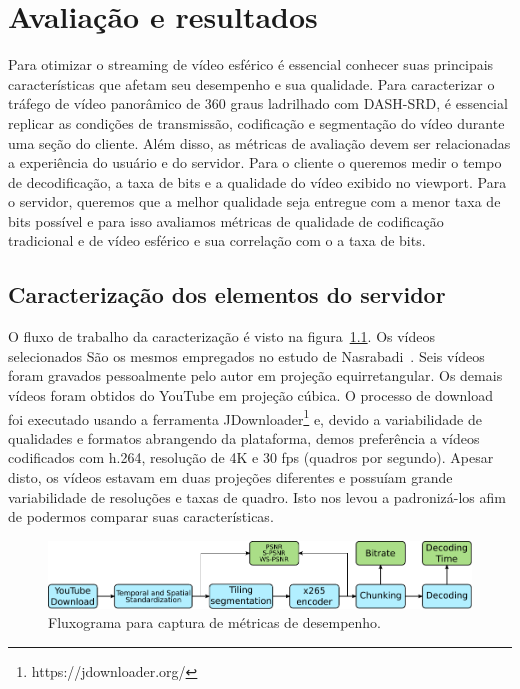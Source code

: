 \chapter{Avaliação e resultados}\label{Cap:Evaluation}

Para otimizar o streaming de vídeo esférico é essencial conhecer suas principais características que afetam seu desempenho e sua qualidade. Para caracterizar o tráfego de vídeo panorâmico de 360 graus ladrilhado com DASH-SRD, é essencial replicar as condições de transmissão, codificação e segmentação do vídeo durante uma seção do cliente. Além disso, as métricas de avaliação devem ser relacionadas a experiência do usuário e do servidor. Para o cliente o queremos medir o tempo de decodificação, a taxa de bits e a qualidade do vídeo exibido no viewport. Para o servidor, queremos que a melhor qualidade seja entregue com a menor taxa de bits possível e para isso avaliamos métricas de qualidade de codificação tradicional e de vídeo esférico e sua correlação com o a taxa de bits.




\section{Caracterização dos elementos do servidor}

O fluxo de trabalho da caracterização é visto na figura~\ref{fig:fluxograma1}. Os vídeos selecionados São os mesmos empregados no estudo de Nasrabadi~\cite{Nasrabadi2019}. Seis vídeos foram gravados pessoalmente pelo autor em projeção equirretangular. Os demais vídeos foram obtidos do YouTube em projeção cúbica. O processo de download foi executado usando a ferramenta JDownloader\footnote{https://jdownloader.org/} e, devido a variabilidade de qualidades e formatos abrangendo da plataforma, demos preferência a vídeos codificados com h.264, resolução de 4K e 30 fps (quadros por segundo). Apesar disto, os vídeos estavam em duas projeções diferentes e possuíam grande variabilidade de resoluções e taxas de quadro. Isto nos levou a padronizá-los afim de podermos comparar suas características.

\begin{figure}[h]
        \centering
        \includegraphics[width=0.7\linewidth]{fig/Fluxograma1.pdf}
        \caption{Fluxograma para captura de métricas de desempenho.}
        \label{fig:fluxograma1}
\end{figure}


